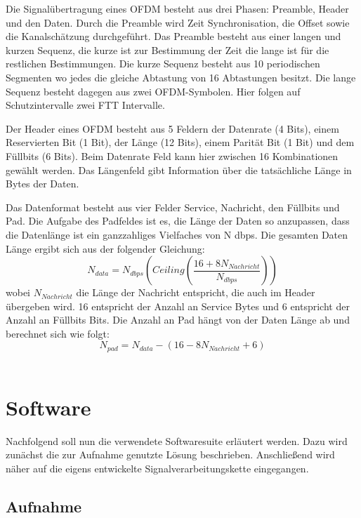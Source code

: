 Die Signalübertragung eines OFDM besteht aus drei Phasen: Preamble, Header und den Daten. Durch die Preamble wird Zeit Synchronisation, die Offset sowie die Kanalschätzung durchgeführt. Das Preamble besteht aus einer langen und kurzen Sequenz, die kurze ist zur Bestimmung der Zeit die lange ist für die restlichen Bestimmungen. Die kurze Sequenz besteht aus 10 periodischen Segmenten wo jedes die gleiche Abtastung von 16 Abtastungen besitzt. Die lange Sequenz besteht dagegen aus zwei OFDM-Symbolen. Hier folgen auf Schutzintervalle zwei FTT Intervalle.

Der Header eines OFDM besteht aus 5 Feldern der Datenrate (4 Bits), einem Reservierten Bit (1 Bit), der Länge (12 Bits), einem Parität Bit (1 Bit) und dem Füllbits (6 Bits). Beim Datenrate Feld kann hier zwischen 16 Kombinationen gewählt werden. Das Längenfeld gibt Information über die tatsächliche Länge in Bytes der Daten.

Das Datenformat besteht aus vier Felder Service, Nachricht, den Füllbits und Pad. Die Aufgabe des Padfeldes ist es, die Länge der Daten so anzupassen, dass die Datenlänge ist ein ganzzahliges Vielfaches von N dbps. Die gesamten Daten Länge ergibt sich aus der folgender Gleichung: 
\begin{equation}
    N_{data}=N_{dbps}(Ceiling(\frac{16+8N_{Nachricht}}{N_{dbps}}))
\end{equation}
wobei $N_{Nachricht}$ die Länge der Nachricht entspricht, die auch im Header übergeben wird. 16 entspricht der Anzahl an Service Bytes und 6 entspricht der Anzahl an Füllbits Bits. Die Anzahl an Pad hängt von der Daten Länge ab und berechnet sich wie folgt: 
\begin{equation}
    N_{pad}=N_{data}-(16-8N_{Nachricht}+6)
\end{equation}
~\cite[S.49ff]{Liu2019}

\section{Software}\label{sct:software}

Nachfolgend soll nun die verwendete Softwaresuite erläutert werden. Dazu wird zunächst die zur Aufnahme genutzte Lösung beschrieben. Anschließend wird näher auf die eigens entwickelte Signalverarbeitungskette eingegangen.

\subsection{Aufnahme}

